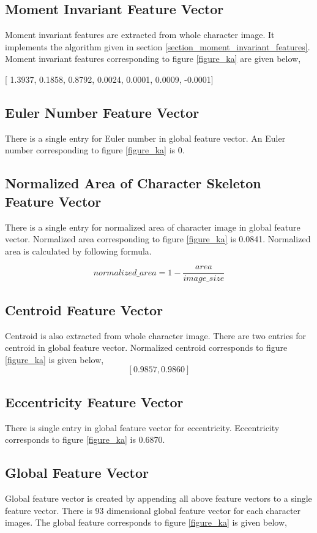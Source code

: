 \subsection{Moment Invariant Feature Vector}
Moment invariant features are extracted from whole character image. It implements the algorithm given in section \ref{section_moment_invariant_features}. Moment invariant features corresponding to figure \ref{figure_ka} are given below,
\begin{center}
[ 1.3937, 0.1858, 0.8792, 0.0024, 0.0001, 0.0009, -0.0001]
\end{center}

\subsection{Euler Number Feature Vector}
There is a single entry for Euler number in global feature vector. An Euler number corresponding to figure \ref{figure_ka} is 0.

\subsection{Normalized Area of Character Skeleton Feature Vector}
There is a single entry for normalized area of character image in global feature vector. Normalized area corresponding to figure \ref{figure_ka} is 0.0841. Normalized area is calculated by following formula.\par
$$normalized\_area=1-\frac{area}{image\_size}$$

\subsection{Centroid Feature Vector}
Centroid is also extracted from whole character image. There are two entries for centroid in global feature vector. Normalized centroid corresponds to figure \ref{figure_ka} is given below,
$$ [0.9857, 0.9860]$$

\subsection{Eccentricity Feature Vector}
There is single entry in global feature vector for eccentricity. Eccentricity corresponds to figure \ref{figure_ka} is 0.6870.

\subsection{Global Feature Vector}
Global feature vector is created by appending all above feature vectors to a single feature vector. There is 93 dimensional global feature vector for each character images. The global feature corresponds to figure \ref{figure_ka} is given below,\par

